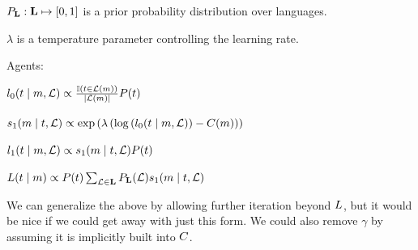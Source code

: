 \documentclass{article}
\begin{document}
\begin{examples}
\begin{examples}
  \item $P_{\mathbf{L}} : \mathbf{L} \mapsto [0,1]$ is a prior probability distribution over languages.    
  
  \item $\lambda$ is a temperature parameter controlling the learning rate.
  \end{examples}

\item Agents:
  \begin{examples}
  \item\label{l0}%
    $l_{0}(t \mid m, \mathcal{L}) \propto
    \frac{\mathbb{I}(t \in \mathcal{L}(m))}{|\mathcal{L}(m)|}
    P(t)$

  \item\label{s1}%
    $s_{1}(m \mid t, \mathcal{L}) \propto
    \exp
    \left(
      \lambda
      \left(
        \log\left(l_{0}(t \mid m, \mathcal{L}) \right)
        - 
        C(m)
      \right)
    \right)$
    
  \item\label{l1}%
    $l_{1}(t \mid m, \mathcal{L}) \propto 
    s_{1}(m \mid t, \mathcal{L})
    P(t)$

  \item\label{L} 
    $L(t \mid m) 
    \propto 
    P(t)
    \sum_{\mathcal{L} \in \mathbf{L}}
    P_{\mathbf{L}}(\mathcal{L})
    s_{1}(m \mid t, \mathcal{L})$
  \end{examples}

\item We can generalize the above by allowing further iteration beyond
  $L$, but it would be nice if we could get away
  with just this form. We could also remove $\gamma$ by assuming it
  is implicitly built into $C$.

\end{examples}




\end{document}
